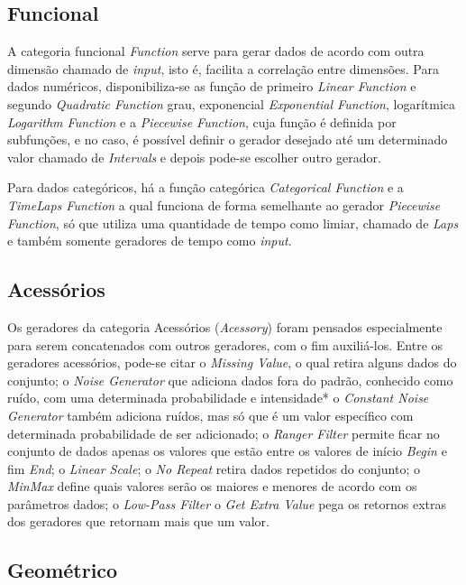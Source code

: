 \documentclass[
	12pt,				%
	openright,			%
	twoside,			%
	a4paper,			%
	english,			%
	brazil				%
	]{abntex2}
\begin{document}
		\subsection{Funcional}
		A categoria funcional \emph{Function} serve para gerar dados de acordo com outra dimensão chamado de \emph{input}, isto é, facilita a correlação entre dimensões.
		Para dados numéricos, disponibiliza-se as 
			função de primeiro \emph{Linear Function} e 
			segundo \emph{Quadratic Function} grau, 
			exponencial \emph{Exponential Function}, 
			logarítmica \emph{Logarithm Function} e
			a \emph{Piecewise Function}, cuja função é definida por subfunções, e no caso, é possível definir o gerador desejado até um determinado valor chamado de \emph{Intervals} e depois pode-se escolher outro gerador.
		\par
		Para dados categóricos, há a função categórica \emph{Categorical Function} e 
		a \emph{TimeLaps Function} a qual funciona de forma semelhante ao gerador \emph{Piecewise Function}, só que utiliza uma quantidade de tempo como limiar, chamado de \emph{Laps} e também somente geradores de tempo como \emph{input}.
		\subsection{Acessórios}
		Os geradores da categoria Acessórios (\emph{Acessory}) foram pensados especialmente para serem concatenados com outros geradores, com o fim auxiliá-los.
		Entre os geradores acessórios, pode-se citar o \emph{Missing Value}, o qual retira alguns dados do conjunto;
			o \emph{Noise Generator} que adiciona dados fora do padrão, conhecido como ruído, com uma determinada probabilidade e intensidade*
			o \emph{Constant Noise Generator} também adiciona ruídos, mas só que é um valor específico com determinada probabilidade de ser adicionado;
			o \emph{Ranger Filter} permite ficar no conjunto de dados apenas os valores que estão entre os valores de início \emph{Begin} e fim \emph{End};
			o \emph{Linear Scale};
			o \emph{No Repeat} retira dados repetidos do conjunto;
			o \emph{MinMax} define quais valores serão os maiores e menores de acordo com os parâmetros dados;
			o \emph{Low-Pass Filter}
			o \emph{Get Extra Value} pega os retornos extras dos geradores que retornam mais que um valor.
		\subsection{Geométrico}
\end{document}
